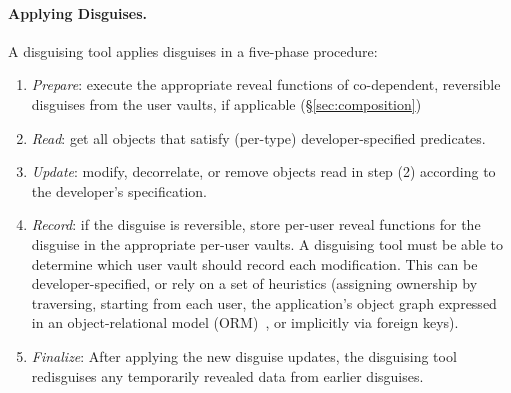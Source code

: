 \paragraph{Applying Disguises.}
A disguising tool applies disguises in a five-phase procedure:
\begin{enumerate}[nosep]
    \item \emph{Prepare}: execute the appropriate reveal functions of co-dependent,
        reversible disguises from the user vaults, if applicable (\S\ref{sec:composition})
        \item \emph{Read}: get all objects that satisfy (per-type) developer-specified predicates.
        \item \emph{Update}: modify, decorrelate, or remove objects read in step (2) according to the
        developer's specification.
    \item \emph{Record}: if the disguise is reversible, store per-user reveal functions for the
        disguise in the appropriate per-user vaults. 
        A disguising tool must be able to determine which user vault should record each modification. This can be
        developer-specified, or rely on a set of heuristics (\eg assigning ownership by traversing,
        starting from each user, the application's object graph expressed in an object-relational
        model (ORM)~\cite{orm}, or implicitly via foreign keys).
        \item \emph{Finalize}: After applying the new disguise updates, the disguising tool
            redisguises any temporarily revealed data from earlier disguises.
\end{enumerate}

